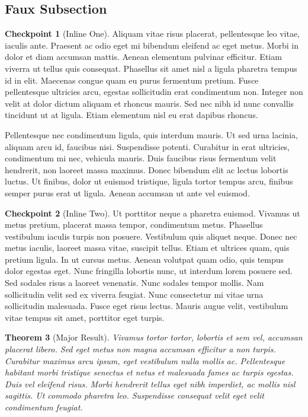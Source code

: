 \documentclass{amsart}
\theoremstyle{plain}%
\newtheorem{theorem}{Theorem}[section]
\theoremstyle{definition}%
\newtheorem{inlineexercise}[theorem]{Checkpoint}
\theoremstyle{remark}%
\numberwithin{equation}{section}
\begin{document}
\subsection{Faux Subsection}\label{section-exercises-multiple-3}%
\begin{inlineexercise}[Inline One]\label{section-exercises-multiple-3-2}%
%
Aliquam vitae risus placerat, pellentesque leo vitae, iaculis ante. Praesent ac odio eget mi bibendum eleifend ac eget metus. Morbi in dolor et diam accumsan mattis. Aenean elementum pulvinar efficitur. Etiam viverra ut tellus quis consequat. Phasellus sit amet nisl a ligula pharetra tempus id in elit. Maecenas congue quam eu purus fermentum pretium. Fusce pellentesque ultricies arcu, egestas sollicitudin erat condimentum non. Integer non velit at dolor dictum aliquam et rhoncus mauris. Sed nec nibh id nunc convallis tincidunt ut at ligula. Etiam elementum nisl eu erat dapibus rhoncus.%
\end{inlineexercise}%
Pellentesque nec condimentum ligula, quis interdum mauris. Ut sed urna lacinia, aliquam arcu id, faucibus nisi. Suspendisse potenti. Curabitur in erat ultricies, condimentum mi nec, vehicula mauris. Duis faucibus risus fermentum velit hendrerit, non laoreet massa maximus. Donec bibendum elit ac lectus lobortis luctus. Ut finibus, dolor ut euismod tristique, ligula tortor tempus arcu, finibus semper purus erat ut ligula. Aenean accumsan ut ante vel euismod.%
\begin{inlineexercise}[Inline Two]\label{section-exercises-multiple-3-4}%
%
Ut porttitor neque a pharetra euismod. Vivamus ut metus pretium, placerat massa tempor, condimentum metus. Phasellus vestibulum iaculis turpis non posuere. Vestibulum quis aliquet neque. Donec nec metus iaculis, laoreet massa vitae, suscipit tellus. Etiam et ultrices quam, quis pretium ligula. In ut cursus metus. Aenean volutpat quam odio, quis tempus dolor egestas eget. Nunc fringilla lobortis nunc, ut interdum lorem posuere sed. Sed sodales risus a laoreet venenatis. Nunc sodales tempor mollis. Nam sollicitudin velit sed ex viverra feugiat. Nunc consectetur mi vitae urna sollicitudin malesuada. Fusce eget risus lectus. Mauris augue velit, vestibulum vitae tempus sit amet, porttitor eget turpis.%
\end{inlineexercise}%
\begin{theorem}[Major Result]\label{section-exercises-multiple-3-5}%
%
Vivamus tortor tortor, lobortis et sem vel, accumsan placerat libero. Sed eget metus non magna accumsan efficitur a non turpis. Curabitur maximus arcu ipsum, eget vestibulum nulla mollis ac. Pellentesque habitant morbi tristique senectus et netus et malesuada fames ac turpis egestas. Duis vel eleifend risus. Morbi hendrerit tellus eget nibh imperdiet, ac mollis nisl sagittis. Ut commodo pharetra leo. Suspendisse consequat velit eget velit condimentum feugiat.%
\end{theorem}
\end{document}

